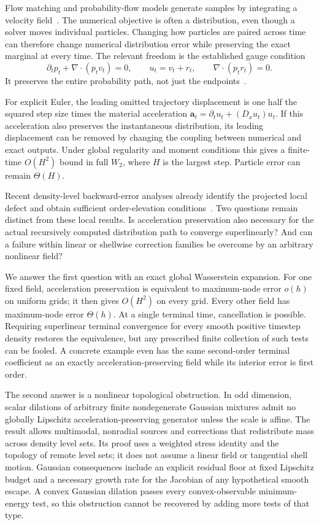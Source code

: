 \documentclass[journal,10pt,romanappendices]{IEEEtran}
\theoremstyle{definition}
\newcommand{\acc}{\mathbf a}
\begin{document}
Flow matching and probability-flow models generate samples by integrating a velocity field~\citep{lipman2023flow,albergo2025stochastic,song2021score}. The numerical objective is often a distribution, even though a solver moves individual particles. Changing how particles are paired across time can therefore change numerical distribution error while preserving the exact marginal at every time. The relevant freedom is the established gauge condition
\[
 \partial_t p_t+\nabla\cdot(p_tv_t)=0,\qquad
 u_t=v_t+r_t,\qquad \nabla\cdot(p_tr_t)=0.
\]
It preserves the entire probability path, not just the endpoints~\citep{ambrosio2005gradient,liu2022marginal,horvat2024gauge}.

For explicit Euler, the leading omitted trajectory displacement is one half the squared step size times the material acceleration
$\acc_t=\partial_tu_t+(D_xu_t)u_t$. If this acceleration also preserves the instantaneous distribution, its leading displacement can be removed by changing the coupling between numerical and exact outputs. Under global regularity and moment conditions this gives a finite-time $O(H^2)$ bound in full $W_2$, where $H$ is the largest step. Particle error can remain $\Theta(H)$.

Recent density-level backward-error analyses already identify the projected local defect and obtain sufficient order-elevation conditions~\citep{obzherin2026density,obzherin2026finite}. Two questions remain distinct from these local results. Is acceleration preservation also necessary for the actual recursively computed distribution path to converge superlinearly? And can a failure within linear or shellwise correction families be overcome by an arbitrary nonlinear field?

We answer the first question with an exact global Wasserstein expansion. For one fixed field, acceleration preservation is equivalent to maximum-node error $o(h)$ on uniform grids; it then gives $O(H^2)$ on every grid. Every other field has maximum-node error $\Theta(h)$. At a single terminal time, cancellation is possible. Requiring superlinear terminal convergence for every smooth positive timestep density restores the equivalence, but any prescribed finite collection of such tests can be fooled. A concrete example even has the same second-order terminal coefficient as an exactly acceleration-preserving field while its interior error is first order.

The second answer is a nonlinear topological obstruction. In odd dimension, scalar dilations of arbitrary finite nondegenerate Gaussian mixtures admit no globally Lipschitz acceleration-preserving generator unless the scale is affine. The result allows multimodal, nonradial sources and corrections that redistribute mass across density level sets. Its proof uses a weighted stress identity and the topology of remote level sets; it does not assume a linear field or tangential shell motion. Gaussian consequences include an explicit residual floor at fixed Lipschitz budget and a necessary growth rate for the Jacobian of any hypothetical smooth escape. A convex Gaussian dilation passes every convex-observable minimum-energy test, so this obstruction cannot be recovered by adding more tests of that type.
\end{document}
